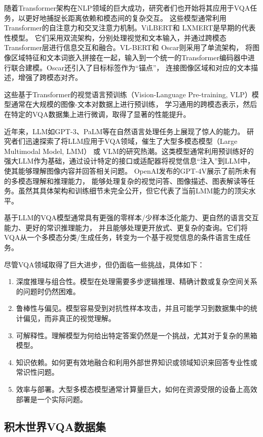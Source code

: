 随着Transformer架构在NLP领域的巨大成功，研究者们也开始将其应用于VQA任务，以更好地捕捉长距离依赖和模态间的复杂交互。
这些模型通常利用Transformer的自注意力和交叉注意力机制。ViLBERT\cite{lu2019vilbert}和 LXMERT\cite{tan2019lxmert}是早期的代表性模型。
它们采用双流架构，分别处理视觉和文本输入，并通过跨模态Transformer层进行信息交互和融合。VL-BERT\cite{su2019vl}和 Oscar\cite{li2020oscar}则采用了单流架构，
将图像区域特征和文本词嵌入拼接在一起，输入到一个统一的Transformer编码器中进行联合建模。Oscar还引入了目标标签作为“锚点”，
连接图像区域和对应的文本描述，增强了跨模态对齐。

这些基于Transformer的视觉语言预训练（Vision-Language Pre-training, VLP）模型通常在大规模的图像-文本对数据上进行预训练，
学习通用的跨模态表示，然后在特定的VQA数据集上进行微调，取得了显著的性能提升。

近年来，LLM如GPT-3、PaLM等在自然语言处理任务上展现了惊人的能力。
研究者们迅速探索了将LLM应用于VQA领域，催生了大型多模态模型（Large Multimodal Model, LMM） 或 
VLM的研究热潮。这类模型通常利用预训练好的强大LLM作为基础，通过设计特定的接口或适配器将视觉信息“注入”到LLM中，使其能够理解图像内容并回答相关问题。
OpenAI发布的GPT-4V\cite{openai2023gpt4v}展示了前所未有的多模态理解和推理能力，
能够处理复杂的视觉问答、图像描述、图表解读等任务。虽然其具体架构和训练细节未完全公开，但它代表了当前LMM能力的顶尖水平。

基于LLM的VQA模型通常具有更强的零样本/少样本泛化能力、更自然的语言交互能力、更好的常识推理能力，
并且能够处理更开放式、更复杂的查询。它们将VQA从一个多模态分类/生成任务，转变为一个基于视觉信息的条件语言生成任务。

尽管VQA领域取得了巨大进步，但仍面临一些挑战，具体如下：
\begin{enumerate}[nosep]
\item 深度推理与组合性。模型在处理需要多步逻辑推理、精确计数或复杂空间关系的问题时仍然困难。
\item 鲁棒性与偏见。模型容易受到对抗性样本攻击，并且可能学习到数据集中的统计偏见，而非真正的视觉理解。
\item 可解释性。理解模型为何给出特定答案仍然是一个挑战，尤其对于复杂的黑箱模型。
\item 知识依赖。如何更有效地融合和利用外部世界知识或领域知识来回答专业性或常识性问题。
\item 效率与部署。大型多模态模型通常计算量巨大，如何在资源受限的设备上高效部署是一个实际问题。
\end{enumerate}
\subsection{积木世界VQA数据集}

